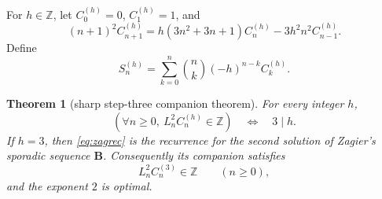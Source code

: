 \documentclass[11pt]{article}
\newtheorem{theorem}{Theorem}
\theoremstyle{remark}
\newcommand{\Z}{\mathbb Z}
\begin{document}
For $h\in\Z$, let $C^{(h)}_0=0$, $C^{(h)}_1=1$, and
\begin{equation}\label{eq:zagrec}
 (n+1)^2C^{(h)}_{n+1}
 =h(3n^2+3n+1)C^{(h)}_n-3h^2n^2C^{(h)}_{n-1}.
\end{equation}
Define
\begin{equation}\label{eq:zagtransform}
 S^{(h)}_n=\sum_{k=0}^n\binom nk(-h)^{n-k}C^{(h)}_k.
\end{equation}

\begin{theorem}[sharp step-three companion theorem]\label{thm:zagB}
For every integer $h$,
\begin{equation}\label{eq:zagclass}
 \left(\forall n\ge0,\ L_n^2C^{(h)}_n\in\Z\right)
 \quad\Longleftrightarrow\quad 3\mid h.
\end{equation}
If $h=3$, then \eqref{eq:zagrec} is the recurrence for the second solution of
Zagier's sporadic sequence $\mathbf B$.  Consequently its companion satisfies
\[
 L_n^2C^{(3)}_n\in\Z\qquad(n\ge0),
\]
and the exponent $2$ is optimal.
\end{theorem}
\end{document}
